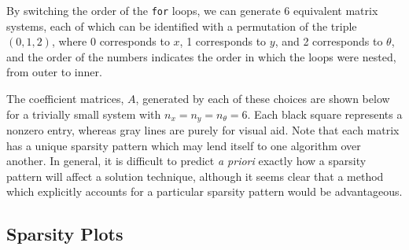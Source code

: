 \documentclass[10pt]{article}
\begin{document}
\begin{multicols}{2}
By switching the order of the \texttt{for} loops, we can generate 6 equivalent matrix systems, each of which can be identified with a permutation of the triple $(0,1,2)$, where 0 corresponds to $x$, 1 corresponds to $y$, and 2 corresponds to $\theta$, and the order of the numbers indicates the order in which the loops were nested, from outer to inner.

The coefficient matrices, $A$, generated by each of these choices are shown below for a trivially small system with $n_x=n_y=n_\theta=6$.
Each black square represents a nonzero entry, whereas gray lines are purely for visual aid.
Note that each matrix has a unique sparsity pattern which may lend itself to one algorithm over another.
In general, it is difficult to predict \textit{a priori} exactly how a sparsity pattern will affect a solution technique, although it seems clear that a method which explicitly accounts for a particular sparsity pattern would be advantageous.

\pagebreak

\subsection{Sparsity Plots}

\newcommand{\spwidth}{2.5in}
\newcommand{\spmgin}{.1in}


\end{multicols}
\end{document}
